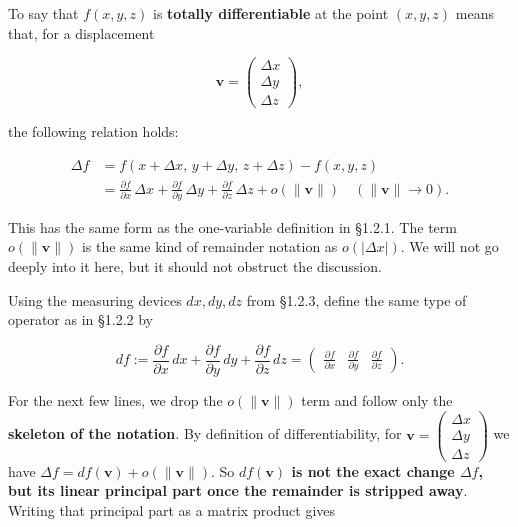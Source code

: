 \documentclass[a4paper,12pt,openany]{book}
\begin{document}
To say that \(f(x,y,z)\) is \textbf{totally differentiable} at the point
\((x,y,z)\) means that, for a displacement

\[
\mathbf{v}=\begin{pmatrix}\Delta x\\\Delta y\\\Delta z\end{pmatrix},
\]

the following relation holds:

\[
\begin{aligned}
\Delta f
&=f(x+\Delta x,\,y+\Delta y,\,z+\Delta z)-f(x,y,z)\\
&=\frac{\partial f}{\partial x}\,\Delta x
{}+\frac{\partial f}{\partial y}\,\Delta y
{}+\frac{\partial f}{\partial z}\,\Delta z
{}+o(\|\mathbf{v}\|)\quad(\|\mathbf{v}\|\to0).
\end{aligned}
\]

This has the same form as the one-variable definition in §1.2.1. The
term \(o(\|\mathbf{v}\|)\) is the same kind of remainder notation as
\(o(|\Delta x|)\). We will not go deeply into it here, but it should not
obstruct the discussion.

Using the measuring devices \(dx,dy,dz\) from §1.2.3, define the same
type of operator as in §1.2.2 by

\[
df:=\frac{\partial f}{\partial x}\,dx+
\frac{\partial f}{\partial y}\,dy+
\frac{\partial f}{\partial z}\,dz
=
\begin{pmatrix}
\frac{\partial f}{\partial x}&
\frac{\partial f}{\partial y}&
\frac{\partial f}{\partial z}
\end{pmatrix}.
\]

For the next few lines, we drop the \(o(\|\mathbf{v}\|)\) term and
follow only the \textbf{skeleton of the notation}. By definition of
differentiability, for
\(\mathbf{v}=\begin{pmatrix}\Delta x\\\Delta y\\\Delta z\end{pmatrix}\)
we have \(\Delta f=df(\mathbf{v})+o(\|\mathbf{v}\|)\). So
\textbf{$df(\mathbf{v})$ is not the exact change $\Delta f$, but its linear principal part once the remainder is stripped away}.
Writing that principal part as a matrix product gives
\end{document}
